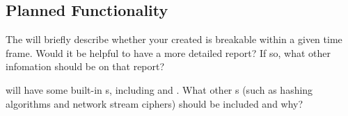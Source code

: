 \subsection{Planned Functionality}

\begin{question}
The \cry{} \cf{} will briefly describe whether your created
\ca{} is breakable within a given time frame.
Would it be helpful to have a more detailed report?
If so, what other infomation should be on that report?
\end{question}

\begin{question}
\cry{} will have some built-in \ca s,
including \rsa{} and \eg.
What other \ca s
(such as hashing algorithms and network stream ciphers)
should be included and why?
\end{question}
